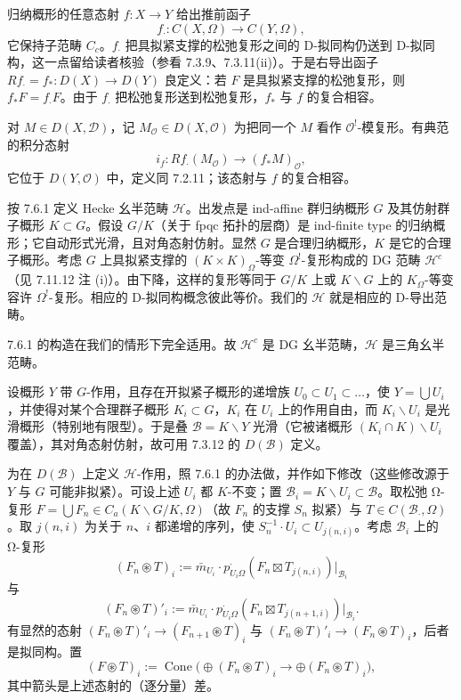  归纳概形的任意态射 $f:X\to Y$ 给出推前函子
\[
f_{\cdot}:C(X,\Omega)\to C(Y,\Omega),
\]
它保持子范畴 $C_c$。$f_{\cdot}$ 把具拟紧支撑的松弛复形之间的 D-拟同构仍送到 D-拟同构，这一点留给读者核验（参看 7.3.9、7.3.11(ii)）。于是右导出函子 $Rf_{\cdot}=f_{*}:D(X)\to D(Y)$ 良定义：若 $F$ 是具拟紧支撑的松弛复形，则 $f_{*}F=f_{\cdot}F$。由于 $f_{\cdot}$ 把松弛复形送到松弛复形，$f_{*}$ 与 $f$ 的复合相容。

对 $M\in D(X,\mathcal{D})$，记 $M_{\mathcal{O}}\in D(X,\mathcal{O})$ 为把同一个 $M$ 看作 $\mathcal{O}^!$-模复形。有典范的积分态射
\[
i_f:Rf_{\cdot}(M_{\mathcal{O}})\to(f_{*}M)_{\mathcal{O}},
\]
它位于 $D(Y,\mathcal{O})$ 中，定义同 7.2.11；该态射与 $f$ 的复合相容。

 按 7.6.1 定义 Hecke 幺半范畴 $\mathcal{H}$。出发点是 ind-affine 群归纳概形 $G$ 及其仿射群子概形 $K\subset G$。假设 $G/K$（关于 fpqc 拓扑的层商）是 ind-finite type 的归纳概形；它自动形式光滑，且对角态射仿射。显然 $G$ 是合理归纳概形，$K$ 是它的合理子概形。考虑 $G$ 上具拟紧支撑的 $(K\times K)_{\Omega}$-等变 $\Omega^!$-复形构成的 DG 范畴 $\mathcal{H}^c$（见 7.11.12 注 (i)）。由下降，这样的复形等同于 $G/K$ 上或 $K\backslash G$ 上的 $K_{\Omega}$-等变容许 $\Omega^!$-复形。相应的 D-拟同构概念彼此等价。我们的 $\mathcal{H}$ 就是相应的 D-导出范畴。


7.6.1 的构造在我们的情形下完全适用。故 $\mathcal{H}^c$ 是 DG 幺半范畴，$\mathcal{H}$ 是三角幺半范畴。

 设概形 $Y$ 带 $G$-作用，且存在开拟紧子概形的递增族 $U_0\subset U_1\subset\ldots$，使 $Y=\bigcup U_i$，并使得对某个合理群子概形 $K_i\subset G$，$K_i$ 在 $U_i$ 上的作用自由，而 $K_i\backslash U_i$ 是光滑概形（特别地有限型）。于是叠 $\mathcal{B}=K\backslash Y$ 光滑（它被诸概形 $(K_i\cap K)\backslash U_i$ 覆盖），其对角态射仿射，故可用 7.3.12 的 $D(\mathcal{B})$ 定义。

为在 $D(\mathcal{B})$ 上定义 $\mathcal{H}$-作用，照 7.6.1 的办法做，并作如下修改（这些修改源于 $Y$ 与 $G$ 可能非拟紧）。可设上述 $U_i$ 都 $K$-不变；置 $\mathcal{B}_i=K\backslash U_i\subset\mathcal{B}$。取松弛 Ω-复形 $F=\bigcup F_n\in C_a(K\backslash G/K,\Omega)$（故 $F_n$ 的支撑 $S_n$ 拟紧）与 $T\in C(\mathcal{B}_{\cdot},\Omega)$。取 $j(n,i)$ 为关于 $n$、$i$ 都递增的序列，使 $S_n^{-1}\cdot U_i\subset U_{j(n,i)}$。考虑 $\mathcal{B}_i$ 上的 Ω-复形
\[
(F_n\circledast T)_i:=\bar m_{U_i}\cdot p^{\cdot}_{U_i\Omega}(F_n\boxtimes T_{j(n,i)})|_{\mathcal{B}_i}
\]
与
\[
(F_n\circledast T)'_i:=\bar m_{U_i}\cdot p^{\cdot}_{U_i\Omega}(F_n\boxtimes T_{j(n+1,i)})|_{\mathcal{B}_i}.
\]
有显然的态射 $(F_n\circledast T)'_i\to(F_{n+1}\circledast T)_i$ 与 $(F_n\circledast T)'_i\to(F_n\circledast T)_i$，后者是拟同构。置
\[
(F\circledast T)_i:=\operatorname{Cone}\big(\oplus(F_n\circledast T)_i\to\oplus(F_n\circledast T)_i\big),
\]
其中箭头是上述态射的（逐分量）差。

